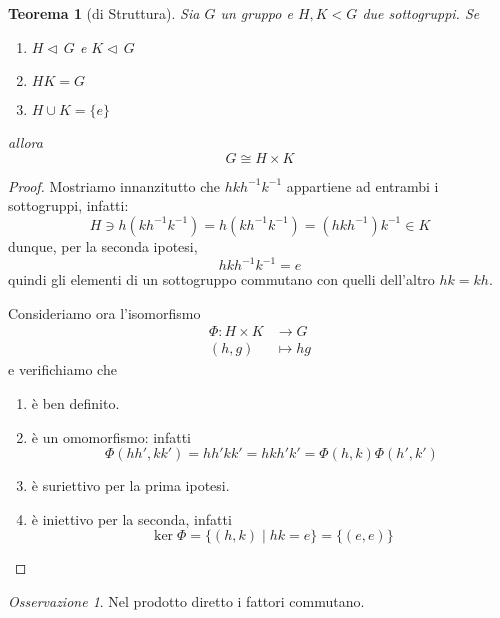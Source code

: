 \documentclass[a4paper]{article}
\newtheorem{theorem}{Teorema}[section]
\theoremstyle{remark}
\newtheorem*{remark}{Osservazione}
\theoremstyle{definition}
\newcommand{\fun}[5]{\begin{align*}
	#1 \colon #2 &\to #3 \\
	#4 &\mapsto #5
	\end{align*}}
\begin{document}
\begin{multicols}{2}



\begin{theorem}[di Struttura]{\label{struttura}}
	Sia $ G $ un gruppo e $ H, K < G $ due sottogruppi. Se
	\begin{enumerate}
		\item $ H \lhd\, G $   e   $ K \lhd\, G $
		\item $ HK = G $
		\item $ H \cup K = \{e\} $
	\end{enumerate}
allora $$  G \cong H \times K  $$
\end{theorem}
\begin{proof}
	Mostriamo innanzitutto che $ hkh^{-1}k^{-1} $ appartiene ad entrambi i sottogruppi, infatti:
	\[ H  \ni h(kh^{-1}k^{-1}) = h(kh^{-1}k^{-1}) = (hkh^{-1})k^{-1} \in K \]
	dunque, per la seconda ipotesi, $$ hkh^{-1}k^{-1} = e $$ quindi gli elementi di un sottogruppo commutano con quelli dell'altro $ hk = kh $.
	
	Consideriamo ora l'isomorfismo \fun{\Phi}{H\times K}{G}{(h,g)}{hg}
	e verifichiamo che
	\begin{enumerate}
		\item è ben definito.
		\item è un omomorfismo: infatti \[ \Phi(hh', kk') = hh'kk' = hkh'k' = \Phi(h, k)\Phi(h',k') \]
		\item è suriettivo per la prima ipotesi.
		\item è iniettivo per la seconda, infatti \[ \ker\Phi = \{ (h, k) \mid hk = e \} = \{ (e, e) \} \]
	\end{enumerate}
\end{proof}

\begin{remark}
	Nel prodotto diretto i fattori commutano.
\end{remark}


\end{multicols}
\end{document}
